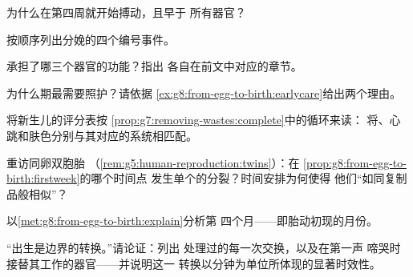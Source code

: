 \begin{exercise}[$\star$]\label{exo:g8:from-egg-to-birth:5}
为什么在第四周就开始搏动，且早于
所有器官？
\end{exercise}

\begin{exercise}[$\star$]\label{exo:g8:from-egg-to-birth:6}
按顺序列出分娩的四个编号事件。
\end{exercise}

\begin{exercise}[$\star\star$]\label{exo:g8:from-egg-to-birth:7}
承担了哪三个器官的功能？指出
各自在前文中对应的章节。
\end{exercise}

\begin{exercise}[$\star\star$]\label{exo:g8:from-egg-to-birth:8}
为什么期最需要照护？请依据
\cref{ex:g8:from-egg-to-birth:earlycare}给出两个理由。
\end{exercise}

\begin{exercise}[$\star\star$]\label{exo:g8:from-egg-to-birth:9}
将新生儿的评分表按
\cref{prop:g7:removing-wastes:complete}中的循环来读：
将、心跳和肤色分别与其对应的系统相匹配。
\end{exercise}

\begin{exercise}[$\star\star$]\label{exo:g8:from-egg-to-birth:10}
重访同卵双胞胎
（\cref{rem:g5:human-reproduction:twins}）：在
\cref{prop:g8:from-egg-to-birth:firstweek}的哪个时间点
发生单个的分裂？时间安排为何使得
他们“如同复制品般相似”？
\end{exercise}

\begin{exercise}[$\star\star$]\label{exo:g8:from-egg-to-birth:11}
以\cref{met:g8:from-egg-to-birth:explain}分析第
四个月——即胎动初现的月份。
\end{exercise}

\begin{exercise}[$\star\star\star$]\label{exo:g8:from-egg-to-birth:12}
“出生是边界的转换。”请论证：列出
处理过的每一次交换，以及在第一声
啼哭时接替其工作的器官——并说明这一
转换以分钟为单位所体现的显著时效性。
\end{exercise}

